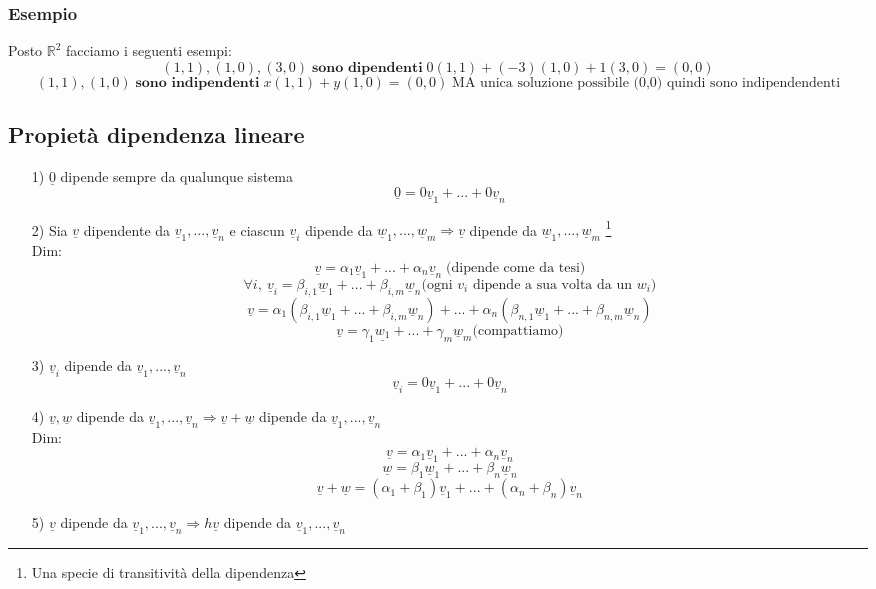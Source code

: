 \subsubsection{Esempio}
Posto $ \mathbb{R}^2 $ facciamo i seguenti esempi:
$$ (1,1),(1,0),(3,0) \; \textbf{sono dipendenti} \; 0(1,1)+(-3)(1,0)+1(3,0) = (0,0) $$
$$ (1,1),(1,0) \; \textbf{sono indipendenti} \; x(1,1) + y(1,0) = (0,0) \; \text{MA unica soluzione possibile (0,0) quindi sono indipendendenti} $$

\subsection{Propietà dipendenza lineare}
\begin{itemize}
\item[1)] $\underline{0}$ dipende sempre da qualunque sistema
$$ \underline{0} = 0\underline{v}_1+...+0\underline{v}_n $$
\item[2)] Sia $\underline{v}$ dipendente da $\underline{v}_1,...,\underline{v}_n$ e ciascun $\underline{v}_i$ dipende da $\underline{w}_1,...,\underline{w}_m \Rightarrow \underline{v} $ dipende da $\underline{w}_1,...,\underline{w}_m$ \footnote{Una specie di transitività della dipendenza} \\
Dim: \\
$$ \underline{v} = \alpha_1\underline{v}_1 + ... + \alpha_n\underline{v}_n \; \text{(dipende come da tesi)}$$
$$ \forall i, \: \underline{v}_i = \beta_{i,1} \underline{w}_1 + ... + \beta_{i,m} \underline{w}_n \text{(ogni $v_i$ dipende a sua volta da un $w_i$)}$$
$$ \underline{v} = \alpha_1(\beta_{i,1} \underline{w}_1 + ... + \beta_{i,m} \underline{w}_n) + ... + \alpha_n (\beta_{n,1} \underline{w}_1 + ... + \beta_{n,m} \underline{w}_n) $$
$$ \underline{v} = \gamma_1\underline{w_1} + ... + \gamma_m \underline{w}_m \text{(compattiamo)}$$
\item[3)] $\underline{v}_i$ dipende da $\underline{v}_1,...,\underline{v}_n$ 
$$ \underline{v}_i = 0\underline{v}_1 + ... + 0\underline{v}_n $$
\item[4)] $ \underline{v}, \underline{w} $ dipende da $\underline{v}_1,...,\underline{v}_n \Rightarrow \underline{v}+\underline{w} $ dipende da $\underline{v}_1,...,\underline{v}_n$\\
Dim:\\
$$ \underline{v} = \alpha_1\underline{v}_1 + ... + \alpha_n\underline{v}_n $$
$$ \underline{w} = \beta_1\underline{w}_1 + ... + \beta_n\underline{w}_n $$
$$ \underline{v} + \underline{w} = (\alpha_1 + \beta_1)\underline{v}_1 + ... + (\alpha_n + \beta_n)\underline{v}_n $$
\item[5)] $ \underline{v} $ dipende da $\underline{v}_1,...,\underline{v}_n \Rightarrow h\underline{v} $ dipende da $\underline{v}_1,...,\underline{v}_n$


\end{itemize}
